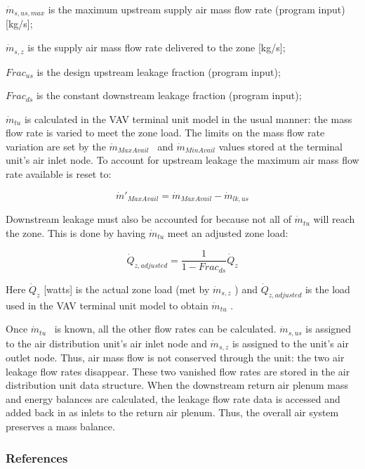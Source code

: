 \({\dot m_{s,us,max}}\) is the maximum upstream supply air mass flow rate (program input) {[}kg/s{]};

\({\dot m_{s,z}}\) is the supply air mass flow rate delivered to the zone {[}kg/s{]};

\(Fra{c_{us}}\) is the design upstream leakage fraction (program input);

\(Fra{c_{ds}}\) is the constant downstream leakage fraction (program input);

\({\dot m_{tu}}\) is calculated in the VAV terminal unit model in the usual manner: the mass flow rate is varied to meet the zone load. The limits on the mass flow rate variation are set by the \({\dot m_{MaxAvail}}\) ~and \({\dot m_{MinAvail}}\) values stored at the terminal unit's air inlet node. To account for upstream leakage the maximum air mass flow rate available is reset to:

\begin{equation}
{\dot m'_{MaxAvail}} = {\dot m_{MaxAvail}} - {\dot m_{lk,us}}
\end{equation}

Downstream leakage must also be accounted for because not all of \({\dot m_{tu}}\) will reach the zone. This is done by having \({\dot m_{tu}}\) meet an adjusted zone load:

\begin{equation}
{\dot Q_{z,adjusted}} = \frac{1}{{1 - Fra{c_{ds}}}}{\dot Q_z}
\end{equation}

Here \({\dot Q_z}\) {[}watts{]} is the actual zone load (met by \({\dot m_{s,z}}\) ) and \({\dot Q_{z,adjusted}}\) is the load used in the VAV terminal unit model to obtain \({\dot m_{tu}}\) .

Once \({\dot m_{tu}}\) ~is known, all the other flow rates can be calculated. \({\dot m_{s,us}}\) is assigned to the air distribution unit's air inlet node and \({\dot m_{s,z}}\) is assigned to the unit's air outlet node. Thus, air mass flow is not conserved through the unit: the two air leakage flow rates disappear. These two vanished flow rates are stored in the air distribution unit data structure. When the downstream return air plenum mass and energy balances are calculated, the leakage flow rate data is accessed and added back in as inlets to the return air plenum. Thus, the overall air system preserves a mass balance.

\subsubsection{References}\label{references-3-004}

